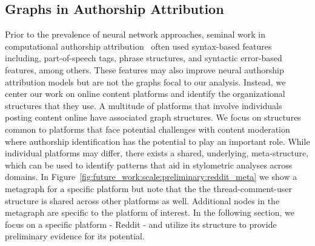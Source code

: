 \subsection{Graphs in Authorship Attribution}

Prior to the prevalence of neural network approaches, seminal work in computational authorship attribution~\cite{stamatatos2009survey} often used syntax-based features including, part-of-speech tags, phrase structures, and syntactic error-based features, among others.
These features may also improve neural authorship attribution models but are not the graphs focal to our analysis.
Instead, we center our work on online content platforms and identify the organizational structures that they use.
A multitude of platforms that involve individuals posting content online have associated graph structures.
We focus on structures common to platforms that face potential challenges with content moderation where authorship identification has the potential to play an important role.
While individual platforms may differ, there exists a shared, underlying, meta-structure, which can be used to identify patterns that aid in stylometric analyses across domains.
In Figure~\ref{fig:future_work:scale:preliminary:reddit_meta} we show a metagraph for a specific platform but note that the the thread-comment-user structure is shared across other platforms as well.
Additional nodes in the metagraph are specific to the platform of interest.
In the following section, we focus on a specific platform - Reddit - and utilize its structure to provide preliminary evidence for its potential.

